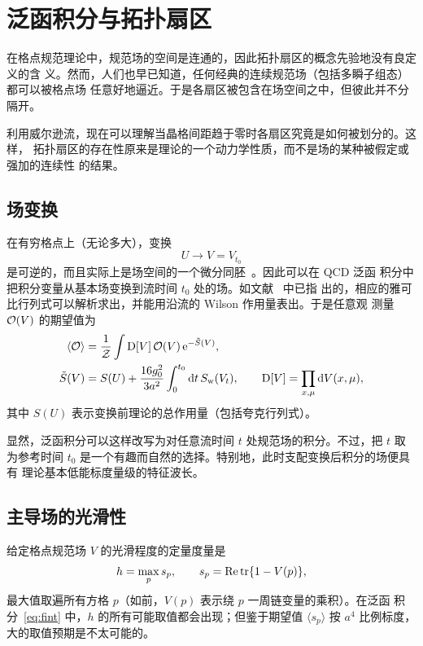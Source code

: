 \section{泛函积分与拓扑扇区}

在格点规范理论中，规范场的空间是连通的，因此拓扑扇区的概念先验地没有良定义的含
义。然而，人们也早已知道，任何经典的连续规范场（包括多瞬子组态）都可以被格点场
任意好地逼近。于是各扇区被包含在场空间之中，但彼此并不分隔开。

利用威尔逊流，现在可以理解当晶格间距趋于零时各扇区究竟是如何被划分的。这样，
拓扑扇区的存在性原来是理论的一个动力学性质，而不是场的某种被假定或强加的连续性
的结果。


\subsection{场变换}

在有穷格点上（无论多大），变换
\begin{equation}
  U\to V=V_{t_0}
  \label{eq:fieldtrafo}
\end{equation}
是可逆的，而且实际上是场空间的一个微分同胚~\cite{TrivMaps}。因此可以在 QCD 泛函
积分中把积分变量从基本场变换到流时间 $t_0$ 处的场。如文献~\cite{TrivMaps} 中已指
出的，相应的雅可比行列式可以解析求出，并能用沿流的 Wilson 作用量表出。于是任意观
测量 $\mathcal{O}(V)$ 的期望值为
\begin{align}
  \langle\mathcal{O}\rangle&={1\over{\cal Z}}\int
  \mathrm{D}[V]\,\mathcal{O}(V)\,\mathrm{e}^{-\tilde{S}(V)},
  \label{eq:fint}\\
  \tilde{S}(V)&=S(U)+{16g_0^2\over3a^2}\int_0^{t_0}\mathrm{d} t\,S_{\mathrm{w}}(V_t),
  \qquad
  \mathrm{D}[V]=\prod_{x,\mu}\mathrm{d} V(x,\mu),
  \label{eq:tSaction}
\end{align}
其中 $S(U)$ 表示变换前理论的总作用量（包括夸克行列式）。

显然，泛函积分可以这样改写为对任意流时间 $t$ 处规范场的积分。不过，把 $t$
取为参考时间 $t_0$ 是一个有趣而自然的选择。特别地，此时支配变换后积分的场便具有
理论基本低能标度量级的特征波长。


\subsection{主导场的光滑性}

给定格点规范场 $V$ 的光滑程度的定量度量是
\begin{equation}
  h=\max_{p}s_p,\qquad s_p=\mathrm{Re}\,\mathrm{tr}\{1-V(p)\},
  \label{eq:hmax}
\end{equation}
最大值取遍所有方格 $p$（如前，$V(p)$ 表示绕 $p$ 一周链变量的乘积）。在泛函
积分~\eqref{eq:fint} 中，$h$ 的所有可能取值都会出现；但鉴于期望值 $\langle s_p\rangle$
按 $a^4$ 比例标度，大的取值预期是不太可能的。

